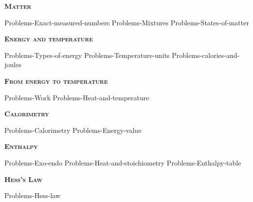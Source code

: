 \documentclass[main.tex]{subfiles}
\newcommand\chapterlabel{Ch-thermochemistry}
\begin{document}
\newpage
\setdoublesep{0.35700 em}  %
\setatomsep{1.78500 em}    %
\setbondoffset{0.18265 em} %
\newcommand{\bondwidth}{0.06642 em} %
\setbondstyle{line width = \bondwidth}
\fancyhfoffset[E,O]{0pt}
\setlength{\columnsep}{30pt}
\begin{conclusion}
\end{conclusion}
\begin{multicols*}{2}\setcounter{numA}{1}

\renewcommand\chapterlabel{Ch-measurements}
{\raggedright\textsc{\textbf{Matter}}\par} %
{Problems-Exact-measured-numbers}%
{Problems-Mixtures}%
{Problems-States-of-matter}%
\renewcommand\chapterlabel{Ch-thermochemistry}



{\raggedright\textsc{\textbf{Energy and temperature }}\par}
{Problems-Types-of-energy}
{Problems-Temperature-units}
{Problems-calories-and-joules}

{\raggedright\textsc{\textbf{From energy to temperature}}\par}
{Problems-Work}%
{Problems-Heat-and-temperature}

{\raggedright\textsc{\textbf{Calorimetry }}\par}
{Problems-Calorimetry}
{Problems-Energy-value}


{\raggedright\textsc{\textbf{Enthalpy }}\par}%
{Problems-Exo-endo}%
{Problems-Heat-and-stoichiometry}%
{Problems-Enthalpy-table}%

{\raggedright\textsc{\textbf{Hess's Law }}\par}%
{Problems-Hess-law}%













\end{multicols*}
\end{document}
